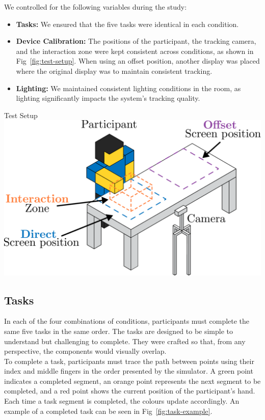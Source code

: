 We controlled for the following variables during the study:
\begin{itemize}[itemsep=-0.25em]
    \item \textbf{Tasks:} We ensured that the five tasks were identical in each condition.
    \item \textbf{Device Calibration:} The positions of the participant, the tracking camera, and the interaction zone were kept consistent across conditions, as shown in Fig~\ref{fig:test-setup}. When using an offset position, another display was placed where the original display was to maintain consistent tracking.
    \item \textbf{Lighting:} We maintained consistent lighting conditions in the room, as lighting significantly impacts the system's tracking quality.
\end{itemize}

\begin{figureBox}[label={fig:test-setup}, width=0.8\linewidth]{Test Setup}
    \includegraphics[width=0.8\linewidth]{./implementation/figures/test-setup.pdf}
\end{figureBox}

\subsection{Tasks}
In each of the four combinations of conditions, participants must complete the same five tasks in the same order. The tasks are designed to be simple to understand but challenging to complete. They were crafted so that, from any perspective, the components would visually overlap. \\

To complete a task, participants must trace the path between points using their index and middle fingers in the order presented by the simulator. A green point indicates a completed segment, an orange point represents the next segment to be completed, and a red point shows the current position of the participant's hand. Each time a task segment is completed, the colours update accordingly. An example of a completed task can be seen in Fig~\ref{fig:task-example}.

